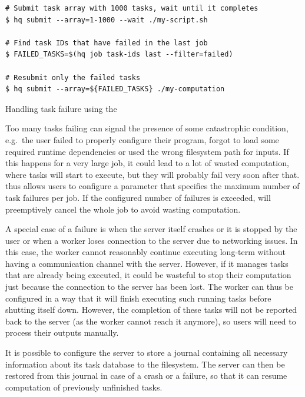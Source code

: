\begin{listing}[h]
	\begin{verbatim}
# Submit task array with 1000 tasks, wait until it completes
$ hq submit --array=1-1000 --wait ./my-script.sh

# Find task IDs that have failed in the last job
$ FAILED_TASKS=$(hq job task-ids last --filter=failed)

# Resubmit only the failed tasks
$ hq submit --array=${FAILED_TASKS} ./my-computation
	\end{verbatim}
	\caption{Handling task failure using the \hyperqueue{} }
	\label{lst:hq-cli-fault-tolerance}
\end{listing}

Too many tasks failing can signal the presence of some catastrophic condition, e.g.\ the user
failed to properly configure their program, forgot to load some required runtime dependencies or
used the wrong filesystem path for inputs. If this happens for a very large job, it could lead to a
lot of wasted computation, where tasks will start to execute, but they will probably fail very soon
after that. \hyperqueue{} thus allows users to configure a parameter that specifies the
maximum number of task failures per job. If the configured number of failures is exceeded,
\hq{} will preemptively cancel the whole job to avoid wasting computation.

A special case of a failure is when the server itself crashes or it is stopped by the user or when
a worker loses connection to the server due to networking issues. In this case, the worker cannot
reasonably continue executing long-term without having a communication channel with the server.
However, if it manages tasks that are already being executed, it could be wasteful to stop their
computation just because the connection to the server has been lost. The worker can thus be
configured in a way that it will finish executing such running tasks before shutting itself down.
However, the completion of these tasks will not be reported back to the server (as the worker
cannot reach it anymore), so users will need to process their outputs manually.

It is possible to configure the server to store a journal containing all necessary information
about its task database to the filesystem. The server can then be restored from this journal in
case of a crash or a failure, so that it can resume computation of previously unfinished tasks.

